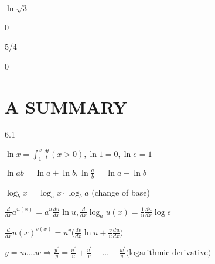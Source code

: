 \documentclass[11pt]{amsbook}
\begin{document}
\begin{hEnumerateArabic}
    \setcounter{enumi}{57}
    \item
        \begin{hEnumerateAlpha}
            \begin{multicols}{2}
                \item \( \ln \sqrt{3}\)  
                \columnbreak
                \item 0
            \end{multicols}
        \end{hEnumerateAlpha}
    \setcounter{enumi}{59}
    \item
        \begin{hEnumerateAlpha}
            \begin{multicols}{2}
                \item 5/4  
                \columnbreak
                \item 0
            \end{multicols}
        \end{hEnumerateAlpha}
\end{hEnumerateArabic}
\section*{A SUMMARY}
    \begin{hEnumerateArabic}
        \item[6.1]
            \begin{hEnumerateAlpha}{}
                \item[] \(\ln x = \int_{1}^{x} \frac{dt}{t} (x > 0), \ln 1 = 0, \ln e = 1 \)
                \item[] \(\ln ab = \ln a + \ln b, \ln \frac{a}{b} = \ln a - \ln b\)
                \item[] \(\log_b x = \log_a x \cdot \log_b a\) (change of base)
                \item[] \(\frac{d}{dx} a^{u(x)} = a^u \frac{du}{dx} \ln u, \frac{d}{dx} \log_a u(x) = \frac{1}{u} \frac{du}{dx} \log e  \)
                \item[] \(\frac{d}{dx} u(x)^{v(x)} = u^v \big(\frac{dv}{dx} \ln u +  \frac{v}{u} \frac{du}{dx} \big)  \)
                \item[] \( y = uv \ldots w  \Rightarrow \frac{y^\prime}{y} = \frac{u^\prime}{u} + \frac{v^\prime}{v} + \ldots + \frac{w^\prime}{w} \text{(logarithmic derivative)} \)
            \end{hEnumerateAlpha}
    \end{hEnumerateArabic}




\end{document}
